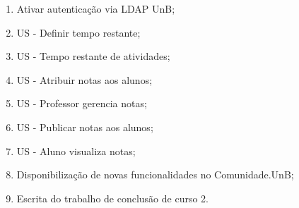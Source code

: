 \begin{enumerate}
\item Ativar autenticação via LDAP UnB;
\item US - Definir tempo restante;
\item US - Tempo restante de atividades;
\item US - Atribuir notas aos alunos;
\item US - Professor gerencia notas;
\item US - Publicar notas aos alunos;
\item US - Aluno visualiza notas;
\item Disponibilização de novas funcionalidades no Comunidade.UnB;
\item Escrita do trabalho de conclusão de curso 2.
\end{enumerate}


